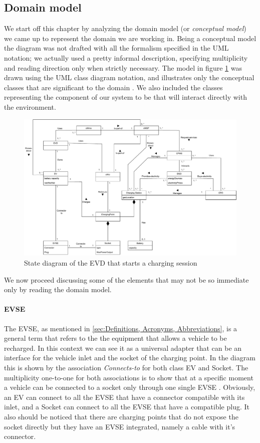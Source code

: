 
\subsection{Domain model}
We start off this chapter by analyzing the domain model (or \textit{conceptual model}) we came up to represent the domain we are working in. Being a conceptual model the diagram was not drafted with all the formalism specified in the UML notation; we actually used a pretty informal description, specifying multiplicity and reading direction only when strictly necessary. The model in figure \ref{domain_model} was drawn using the UML class diagram notation, and illustrates only the conceptual classes that are significant to the domain \cite{larmanUML}. We also included the classes representing the component of our system to be that will interact directly with the environment.\\

\begin{figure}[H]
    \centering
    \includegraphics[width=1\textwidth]{Images/cp2/domain_model_v1}
    \caption{State diagram of the EVD that starts a charging session}
    \label{domain_model}
\end{figure}

We now proceed discussing some of the elements that may not be so immediate only by reading the domain model.


\paragraph{EVSE}
The EVSE, as mentioned in \ref{sec:Definitions, Acronyms, Abbreviations}, is a general term that refers to the the equipment that allows a vehicle to be recharged. In this context we can see it as a universal adapter that can be an interface for the vehicle inlet and the socket of the charging point. In the diagram this is shown by the association \textit{Connects-to} for both class EV and Socket. The multiplicity one-to-one for both associations is to show that at a specific moment a vehicle can be connected to a socket only through one single EVSE \cite{larmanUML}. Obviously, an EV can connect to all the EVSE that have a connector compatible with its inlet, and a Socket can connect to all the EVSE that have a compatible plug. It also should be noticed that there are charging points that do not expose the socket directly but they have an EVSE integrated, namely a cable with it's connector.

